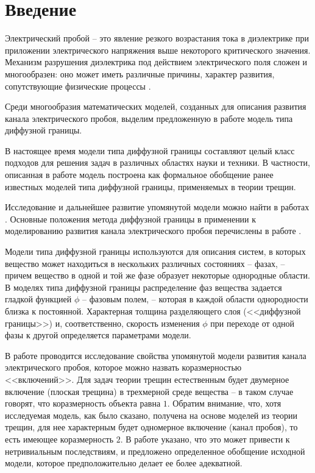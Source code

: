 
\section{Введение}

Электрический пробой -- это явление резкого возрастания тока в диэлектрике при приложении электрического напряжения выше некоторого критического значения. Механизм разрушения диэлектрика под действием электрического поля сложен и многообразен: оно может иметь различные причины, характер развития, сопутствующие физические процессы \cite{vorobiev_dielectric_physics}.

Среди многообразия математических моделей, созданных для описания развития канала электрического пробоя, выделим предложенную в работе \cite{pitike_dielectric_breakdown} модель типа диффузной границы.

В настоящее время модели типа диффузной границы составляют целый класс подходов для решения задач в различных областях науки и техники. В частности, описанная в работе \cite{pitike_dielectric_breakdown} модель построена как формальное обобщение ранее известных моделей типа диффузной границы, применяемых в теории трещин.

Исследование и дальнейшее развитие упомянутой модели можно найти в работах \cite{zipunova_higher_codimension, zipunova_conservative, zipunova_thermomechanical, ponomarev_stability}. Основные положения метода диффузной границы в применении к моделированию развития канала электрического пробоя перечислены в работе \cite{ponomarev_stability}.

Модели типа диффузной границы используются для описания систем, в которых вещество может находиться в нескольких различных состояниях -- фазах, -- причем вещество в одной и той же фазе образует некоторые однородные области. В моделях типа диффузной границы распределение фаз вещества задается гладкой функцией $\phi$ -- фазовым полем, -- которая в каждой области однородности близка к постоянной. Характерная толщина разделяющего слоя (<<диффузной границы>>) и, соответственно, скорость изменения $\phi$ при переходе от одной фазы к другой определяется параметрами модели.

В работе \cite{zipunova_higher_codimension} проводится исследование свойства упомянутой модели развития канала электрического пробоя, которое можно назвать коразмерностью <<включений>>. Для задач теории трещин естественным будет двумерное включение (плоская трещина) в трехмерной среде вещества -- в таком случае говорят, что коразмерность объекта равна $1$. Обратим внимание, что, хотя исследуемая модель, как было сказано, получена на основе моделей из теории трещин, для нее характерным будет одномерное включение (канал пробоя), то есть имеющее коразмерность $2$. В работе \cite{zipunova_higher_codimension} указано, что это может привести к нетривиальным последствиям, и предложено определенное обобщение исходной модели, которое предположительно делает ее более адекватной.

